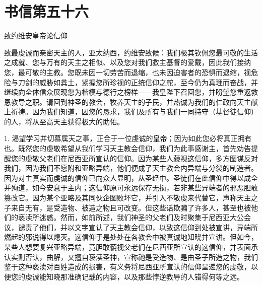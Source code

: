 

\section{书信第五十六}

致约维安皇帝论信仰\par

\par

致最虔诚而亲密天主的人，亚太纳西，约维安致候：我们极其钦佩您最可敬的生活之成就、您与万有的天主之相似、以及您对我们救主基督的爱戴，因此我们接纳您，最可敬的主教。您既未因一切劳苦而退缩，也未因迫害者的恐惧而退缩，视危险与刀剑的威胁如粪土，紧握您所珍视的正统信仰之舵，至今仍为真理而奋战，并继续向全体信众展现您为楷模与德行之榜样——我皇陛下召回您，并盼望您重返救恩教导之职。请回到神圣的教会，牧养天主的子民，并热诚为我们的仁政向天主献上祈祷。因为我们知道，因您的恳求，我们及所有与我们一同持守（基督徒信仰）的人，将从至高天主获得极大的助佑。\par

1. 渴望学习并切慕属天之事，正合于一位虔诚的皇帝；因为如此您必将真正拥有也。既然您的虔敬希望从我们学习天主教会信仰，我们为此事感谢主，首先劝告提醒您的虔敬父老们在尼西亚所宣认的信仰。因为某些人藐视这信仰，多方图谋反对我们，因为我们不愿附和亚略异端，他们便成了天主教会内异端与分裂的制造者。因为对主真实而虔诚的信仰已向众人显明，从圣经中。圣徒们在此信仰中得以成全并殉道，如今安息于主内；这信仰原可永远保存无损，若非某些异端者的邪恶胆敢篡改它。因为某个亚略及其同伙企图败坏它，并引入不敬虔来代替它，声称天主之子来自无有，是受造物、被造之物且可改变。但这些话欺骗了许多人，甚至也被他们的亵渎所迷惑。然而，如前所述，我们神圣的父老们及时聚集于尼西亚大公会议，谴责了他们，并以文字宣认了天主教会信仰，以致这信仰到处被宣讲，异端所燃起的邪说得以熄灭。这信仰于是处处在各教会中被真诚地知晓并宣讲。但如今，某些人想要复兴亚略异端，竟胆敢藐视父老们在尼西亚所宣认的这信仰，并表面承认实则否认，曲解，又擅自亵渎圣神，宣称祂是受造物、是由圣子所造之物，我们鉴于这种亵渎对百姓造成的损害，有义务将尼西亚所宣认的信仰呈递您的虔敬，以便您的虔诚能知晓那准确记载的内容，以及那些悖逆教导的人错得何等之远。\par

